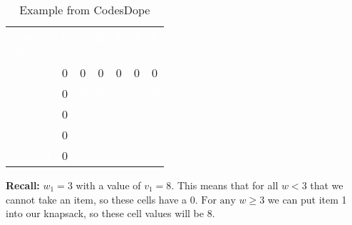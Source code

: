 \begin{itemize}
\begin{itemize}
				\begin{table}[h!]
					\begin{center}
						\caption{Example from CodesDope \cite{noauthor_knapsack_nodate-2}}
						\label{tab:example2-step2}
						\begin{tabular}{R|c|c|c|c|c|c}
							\toprule %
							\textcolor{white}{\textbf{$w \rightarrow$}} & \textcolor{white}{\textbf{0}} & \textcolor{white}{\textbf{1}} & \textcolor{white}{\textbf{2}} & \textcolor{white}{\textbf{3}} & \textcolor{white}{\textbf{4}} & \textcolor{white}{\textbf{5}}\\
							\textcolor{white}{$item_i \downarrow$} & & & & & & \\
							\midrule %
							\textcolor{white}{0} & 0 & 0 & 0 & 0 & 0 &  0 \\
							\hline
							\textcolor{white}{1} &  0 & \textcolor{white}{0} & \textcolor{white}{0} & \textcolor{white}{8} & \textcolor{white}{8} & \textcolor{white}{8} \\
							\hline
							\textcolor{white}{2} & 0 & & & & \\
							\hline
							\textcolor{white}{3} & 0 & & & & & \\
							\hline
							\textcolor{white}{4} & 0 & & & & &
						\end{tabular}
					\end{center} \vspace{12pt}
				\end{table}
				\textbf{Recall:} $w_1 = 3$ with a value of $v_1 = 8$. This means that for all $w < 3$ that we cannot take an item, so these cells have a $0 \mbox{. For any } w \geq 3$ we can put item 1 into our knapsack, so these cell values will be $8$. 
				

\end{itemize}
\end{itemize}
